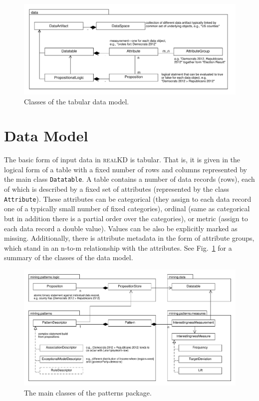 \documentclass{scrartcl}
\newcommand{\class}[1]{\texttt{#1}}
\newcommand{\kdtub}{\textsc{realKD}\xspace}
\begin{document}
\begin{figure}[ht]
\includegraphics[width=\columnwidth]{data/data_overview.pdf}
\caption{Classes of the tabular data model.}
\label{fig:dataclasses}
\end{figure}
\section{Data Model}
The basic form of input data in \kdtub is tabular. That is, it is given in the
logical form of a table with a fixed number of rows and columns represented by
the main class \class{Datatable}.
A table contains a number of data records (rows), each of which is described by
a fixed set of attributes (represented by the class \class{Attribute}). These
attributes can be categorical (they assign to each data record one of a typically small number of fixed categories), ordinal (same as
categorical but in addition there is a partial order over the categories), or
metric (assign to each data record a double value). Values can be also be
explicitly marked as missing. Additionally, there is
attribute metadata in the form of attribute groups, which stand in an n-to-m
relationship with the attributes. See Fig.~\ref{fig:dataclasses} for a summary
of the classes of the data model.
\begin{figure}
\includegraphics[width=\columnwidth]{mining/patterns.pdf}
\caption{The main classes of the patterns package.}
\end{figure}
\end{document}
